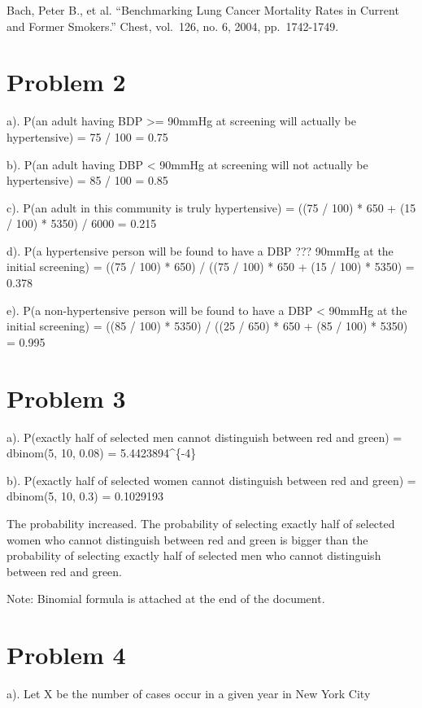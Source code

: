 \documentclass[]{article}
\begin{document}
Bach, Peter B., et al. ``Benchmarking Lung Cancer Mortality Rates in
Current and Former Smokers.'' Chest, vol.~126, no. 6, 2004,
pp.~1742-1749.

\section{Problem 2}\label{problem-2}

a). P(an adult having BDP \textgreater{}= 90mmHg at screening will
actually be hypertensive) = 75 / 100 = 0.75

b). P(an adult having DBP \textless{} 90mmHg at screening will not
actually be hypertensive) = 85 / 100 = 0.85

c). P(an adult in this community is truly hypertensive) = ((75 / 100) *
650 + (15 / 100) * 5350) / 6000 = 0.215

d). P(a hypertensive person will be found to have a DBP ??? 90mmHg at
the initial screening) = ((75 / 100) * 650) / ((75 / 100) * 650 + (15 /
100) * 5350) = 0.378

e). P(a non-hypertensive person will be found to have a DBP \textless{}
90mmHg at the initial screening) = ((85 / 100) * 5350) / ((25 / 650) *
650 + (85 / 100) * 5350) = 0.995

\section{Problem 3}\label{problem-3}

a). P(exactly half of selected men cannot distinguish between red and
green) = dbinom(5, 10, 0.08) = 5.4423894\^{}\{-4\}

b). P(exactly half of selected women cannot distinguish between red and
green) = dbinom(5, 10, 0.3) = 0.1029193

The probability increased. The probability of selecting exactly half of
selected women who cannot distinguish between red and green is bigger
than the probability of selecting exactly half of selected men who
cannot distinguish between red and green.

Note: Binomial formula is attached at the end of the document.

\section{Problem 4}\label{problem-4}

a). Let X be the number of cases occur in a given year in New York City
\end{document}
